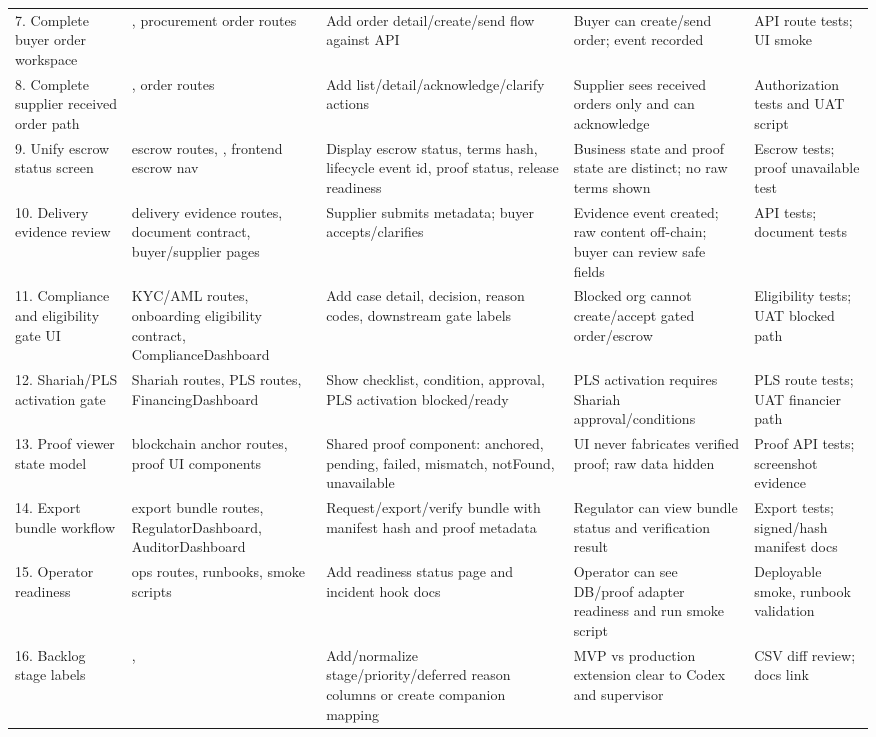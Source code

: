 \documentclass[conference]{IEEEtran}
\begin{document}
\begin{table}[t]
\begin{tabularx}{\textwidth}{P{2.6cm} P{3.2cm} P{3.5cm} P{3.5cm} Y}
7. Complete buyer order workspace & , procurement order routes & Add order detail/create/send flow against API & Buyer can create/send order; event recorded & API route tests; UI smoke \\
8. Complete supplier received order path & , order routes & Add list/detail/acknowledge/clarify actions & Supplier sees received orders only and can acknowledge & Authorization tests and UAT script \\
9. Unify escrow status screen & escrow routes, , frontend escrow nav & Display escrow status, terms hash, lifecycle event id, proof status, release readiness & Business state and proof state are distinct; no raw terms shown & Escrow tests; proof unavailable test \\
10. Delivery evidence review & delivery evidence routes, document contract, buyer/supplier pages & Supplier submits metadata; buyer accepts/clarifies & Evidence event created; raw content off-chain; buyer can review safe fields & API tests; document tests \\
11. Compliance and eligibility gate UI & KYC/AML routes, onboarding eligibility contract, ComplianceDashboard & Add case detail, decision, reason codes, downstream gate labels & Blocked org cannot create/accept gated order/escrow & Eligibility tests; UAT blocked path \\
12. Shariah/PLS activation gate & Shariah routes, PLS routes, FinancingDashboard & Show checklist, condition, approval, PLS activation blocked/ready & PLS activation requires Shariah approval/conditions & PLS route tests; UAT financier path \\
13. Proof viewer state model & blockchain anchor routes, proof UI components & Shared proof component: anchored, pending, failed, mismatch, notFound, unavailable & UI never fabricates verified proof; raw data hidden & Proof API tests; screenshot evidence \\
14. Export bundle workflow & export bundle routes, RegulatorDashboard, AuditorDashboard & Request/export/verify bundle with manifest hash and proof metadata & Regulator can view bundle status and verification result & Export tests; signed/hash manifest docs \\
15. Operator readiness & ops routes, runbooks, smoke scripts & Add readiness status page and incident hook docs & Operator can see DB/proof adapter readiness and run smoke script & Deployable smoke, runbook validation \\
16. Backlog stage labels & ,  & Add/normalize stage/priority/deferred reason columns or create companion mapping & MVP vs production extension clear to Codex and supervisor & CSV diff review; docs link \\
\bottomrule
\end{tabularx}
\end{table}
\end{document}
